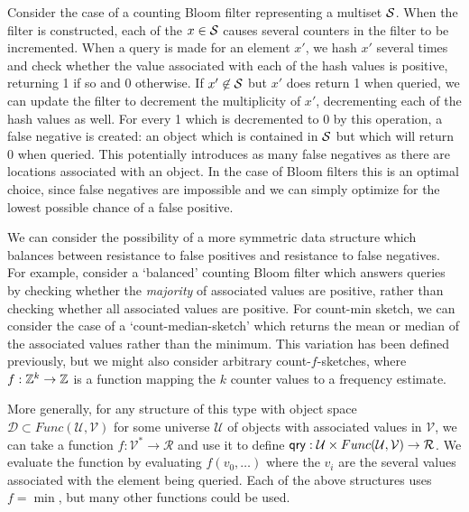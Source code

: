 Consider the case of a counting Bloom filter representing a multiset $\mathcal{S}$. When the filter is constructed, each of the $x \in \mathcal{S}$ causes several counters in the filter to be incremented. When a query is made for an element $x'$, we hash $x'$ several times and check whether the value associated with each of the hash values is positive, returning 1 if so and 0 otherwise. If $x' \not\in \mathcal{S}$ but $x'$ does return 1 when queried, we can update the filter to decrement the multiplicity of $x'$, decrementing each of the hash values as well. For every 1 which is decremented to 0 by this operation, a false negative is created: an object which is contained in $\mathcal{S}$ but which will return 0 when queried. This potentially introduces as many false negatives as there are locations associated with an object. In the case of Bloom filters this is an optimal choice, since false negatives are impossible and we can simply optimize for the lowest possible chance of a false positive.

We can consider the possibility of a more symmetric data structure which balances between resistance to false positives and resistance to false negatives. For example, consider a `balanced' counting Bloom filter which answers queries by checking whether the \emph{majority} of associated values are positive, rather than checking whether all associated values are positive. For count-min sketch, we can consider the case of a `count-median-sketch' which returns the mean or median of the associated values rather than the minimum. This variation has been defined previously, but we might also consider arbitrary count-$f$-sketches, where $f: \mathbb{Z}^k \to \mathbb{Z}$ is a function mapping the $k$ counter values to a frequency estimate. 

More generally, for any structure of this type with object space $\mathcal{D} \subset Func(\mathcal{U},\mathcal{V})$ for some universe $\mathcal{U}$ of objects with associated values in $\mathcal{V}$, we can take a function $f: \mathcal{V}^* \to \mathcal{R}$ and use it to define $\mathsf{qry}: \mathcal{U} \times Func(\mathcal{U},\mathcal{V}) \to \mathcal{R}$. We evaluate the function by evaluating $f(v_0,\ldots)$ where the $v_i$ are the several values associated with the element being queried. Each of the above structures uses $f = \min$, but many other functions could be used.  

